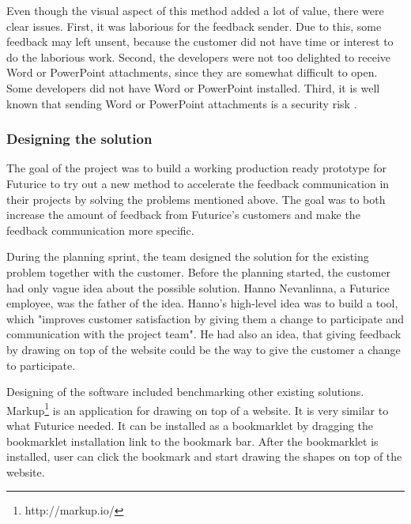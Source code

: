 \documentclass[english,12pt,a4paper,pdftex]{article}
\begin{document}
Even though the visual aspect of this method added a lot of value, there were clear issues. First, it was laborious for the feedback sender. Due to this, some feedback may left unsent, because the customer did not have time or interest to do the laborious work. Second, the developers were not too delighted to receive Word or PowerPoint attachments, since they are somewhat difficult to open. Some developers did not have Word or PowerPoint installed. Third, it is well known that sending Word or PowerPoint attachments is a security risk \citep{tyson2011}.

\subsubsection{Designing the solution}

The goal of the project was to build a working production ready prototype for Futurice to try out a new method to accelerate the feedback communication in their projects by solving the problems mentioned above. The goal was to both increase the amount of feedback from Futurice's customers and make the feedback communication more specific.

During the planning sprint, the team designed the solution for the existing problem together with the customer. Before the planning started, the customer had only vague idea about the possible solution. Hanno Nevanlinna, a Futurice employee, was the father of the idea. Hanno's high-level idea was to build a tool, which "improves customer satisfaction by giving them a change to participate and communication with the project team". He had also an idea, that giving feedback by drawing on top of the website could be the way to give the customer a change to participate.

Designing of the software included benchmarking other existing solutions. Markup\footnote{http://markup.io/} is an application for drawing on top of a website. It is very similar to what Futurice needed. It can be installed as a bookmarklet by dragging the bookmarklet installation link to the bookmark bar. After the bookmarklet is installed, user can click the bookmark and start drawing the shapes on top of the website. 
\end{document}
